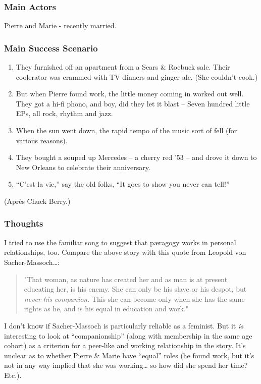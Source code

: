 \subsubsection{Main Actors}

Pierre and Marie - recently married.

\subsubsection{Main Success Scenario}

\begin{enumerate}
\item
  They furnished off an apartment from a Sears \& Roebuck sale. Their
  coolerator was crammed with TV dinners and ginger ale. (She couldn't
  cook.)
\item
  But when Pierre found work, the little money coming in worked out
  well. They got a hi-fi phono, and boy, did they let it blast -- Seven
  hundred little EPs, all rock, rhythm and jazz.
\item
  When the sun went down, the rapid tempo of the music sort of fell (for
  various reasons).
\item
  They bought a souped up Mercedes -- a cherry red '53 -- and drove it
  down to New Orleans to celebrate their anniversary.
\item
  ``C'est la vie,'' say the old folks, ``It goes to show you never can
  tell!''
\end{enumerate}
(Après Chuck Berry.)

\subsubsection{Thoughts}

I tried to use the familiar song to suggest that pæragogy works in
personal relationships, too. Compare the above story with this quote
from Leopold von Sacher-Massoch\ldots{}:

\begin{quote}
"That woman, as nature has created her and as man is at present
educating her, is his enemy. She can only be his slave or his despot,
but \emph{never his companion}. This she can become only when she has
the same rights as he, and is his equal in education and work."

\end{quote}
I don't know if Sacher-Massoch is particularly reliable as a feminist.
But it \emph{is} interesting to look at ``companionship'' (along with
membership in the same age cohort) as a criterion for a peer-like and
working relationship in the story. It's unclear as to whether Pierre \&
Marie have ``equal'' roles (he found work, but it's not in any way
implied that she was working\ldots{} so how did she spend her time?
Etc.).
